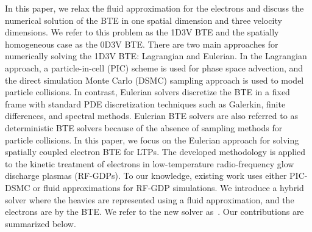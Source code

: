 In this paper, we relax the fluid approximation for the electrons and discuss the numerical solution of the BTE in one spatial dimension and three velocity dimensions. We refer to this problem as the 1D3V BTE and the spatially homogeneous case as the 0D3V BTE. There are two main approaches for numerically solving the 1D3V BTE: Lagrangian and Eulerian. In the Lagrangian approach, a particle-in-cell (PIC) scheme is used for phase space advection, and the direct simulation Monte Carlo (DSMC) sampling approach is used to model particle collisions. In contrast, Eulerian solvers discretize the BTE in a fixed frame with standard PDE discretization techniques such as Galerkin, finite differences, and spectral methods. Eulerian BTE solvers are also referred to as deterministic BTE solvers because of the absence of sampling methods for particle collisions. In this paper, we focus on the Eulerian approach for solving spatially coupled electron BTE for LTPs. The developed methodology is applied to the kinetic treatment of electrons in low-temperature radio-frequency glow discharge plasmas (RF-GDPs). To our knowledge, existing work uses either PIC-DSMC or fluid approximations for RF-GDP simulations. We introduce a hybrid solver where the heavies are represented using a fluid approximation, and the electrons are by the BTE. We refer to the new solver as~\bte. Our contributions are summarized below. 

